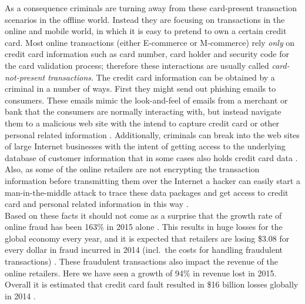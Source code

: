 As a consequence criminals are turning away from these card-present transaction scenarios in the offline world. Instead they are focusing on transactions in the online and mobile world, in which it is easy to pretend to own a certain credit card. Most online transactions (either \gls{E-commerce} or \gls{M-commerce}) rely \emph{only} on credit card information such as card number, card holder and security code for the card validation process; therefore these interactions are usually called \emph{card-not-present transactions}. The credit card information can be obtained by a criminal in a number of ways. First they might send out phishing emails to consumers. These emails mimic the look-and-feel of emails from a merchant or bank that the consumers are normally interacting with, but instead navigate them to a malicious web site with the intend to capture credit card or other personal related information \citep{ConsumerAction2009}. Additionally, criminals can break into the web sites of large Internet businesses with the intent of getting access to the underlying database of customer information that in some cases also holds credit card data \citep{Holmes2015}. Also, as some of the online retailers are not encrypting the transaction information before transmitting them over the Internet a hacker can easily start a man-in-the-middle attack to trace these data packages and get access to credit card and personal related information in this way \citep{Captain2015}. \\

Based on these facts it should not come as a surprise that the growth rate of online fraud has been 163\% in 2015 alone \citep{PYMNTS2016}. This results in huge losses for the global economy every year, and it is expected that retailers are losing \$3.08 for every dollar in fraud incurred in 2014 (incl.\ the costs for handling fraudulent transactions) \citep{Rampton2015}. These fraudulent transactions also impact the revenue of the online retailers. Here we have seen a growth of 94\% in revenue lost in 2015. Overall it is estimated that credit card fault resulted in \$16 billion losses globally in 2014 \citep{PYMNTS2016} \citep{BusinessWire2015}. \\

